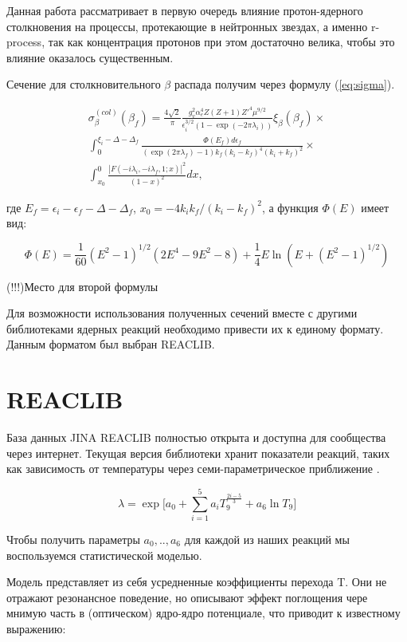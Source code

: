 \documentclass[%
master,    %
natbib,      %
subf,        %
href,        %
colorlinks,  %
]{disser}
\begin{document}
Данная работа рассматривает в первую очередь влияние протон-ядерного столкновения на процессы, протекающие в нейтронных звездах, а именно r-process, так как концентрация протонов при этом достаточно велика, чтобы это влияние оказалось существенным. 

Сечение для столкновительного $\beta$ распада получим через формулу (\ref{eq:sigma}).

\begin{equation}
\label{eq:sigma}
\begin{split}
\sigma_\beta^{(col)}(\beta_f) =
\frac{4\sqrt{2}}{\pi}\frac{g_v^2\alpha_e^4 Z (Z + 1)Z'^4\mu^{9/2}}{\epsilon_i^{3/2}(1-\exp(-2\pi\lambda_i))}\xi_\beta(\beta_f) \times \\
\int_{0}^{\xi_i-\Delta-\Delta_f}\frac{\Phi(E_f)d\epsilon_f}{(\exp(2\pi\lambda_f)-1)k_f(k_i-k_f)^4(k_i+k_f)^2} \times \\
\int_{x_0}^{0}\frac{\left|F(-i\lambda_i,-i\lambda_f,1;x)\right|^2}{(1-x)^2}dx,
\end{split}
\end{equation}

где $E_f = \epsilon_i - \epsilon_f - \Delta - \Delta_f$, $x_0 = -4 k_i k_f / (k_i - k_f)^2$, а функция $\Phi(E)$ имеет вид:

$$
\Phi(E) = \frac{1}{60}(E^2-1)^{1/2}(2E^4-9E^2-8)+\frac{1}{4}E\ln(E+(E^2-1)^{1/2})
$$


(!!!)Место для второй формулы

Для возможности использования полученных сечений вместе с другими библиотеками ядерных реакций необходимо привести их к единому формату. Данным форматом был выбран REACLIB.

\section{REACLIB}

База данных JINA REACLIB полностью открыта и доступна для сообщества через интернет. Текущая версия библиотеки хранит показатели реакций, таких как зависимость от температуры через семи-параметрическое приближение \cite{jina}.

$$\lambda = \exp \bigg[a_0 + \sum_{i=1}^{5}a_iT_9^{\frac{2i-5}{3}}+a_6 \ln T_9\bigg]$$

Чтобы получить параметры $a_0, .., a_6$ для каждой из наших реакций мы воспользуемся статистической моделью.

Модель представляет из себя усредненные коэффициенты перехода T. Они не отражают резонансное поведение, но описывают эффект поглощения чере мнимую часть в (оптическом) ядро-ядро потенциале, что приводит к известному выражению:
\end{document}
